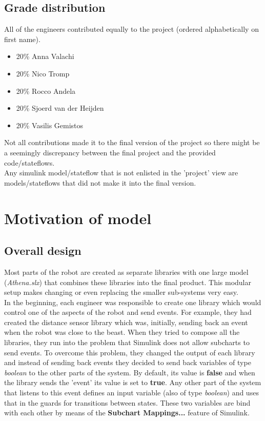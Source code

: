 \documentclass[a4paper,12pt]{article}
\begin{document}
\subsection{Grade distribution}
All of the engineers contributed equally to the project (ordered alphabetically on first name).
\begin{itemize}
	\item 20\% Anna Valachi
	\item 20\% Nico Tromp
	\item 20\% Rocco Andela
	\item 20\% Sjoerd van der Heijden
	\item 20\% Vasilis Gemistos 
\end{itemize}
Not all contributions made it to the final version of the project so there might be a 
seemingly discrepancy between the final project and the provided code/stateflows.\\
Any simulink model/stateflow that is not enlisted in the 'project' view are models/stateflows that did not make it into the final version.
\section{Motivation of model}
\subsection{Overall design}
Most parts of the robot are created as separate libraries with one large model (\textit{Athena.slx}) that combines these libraries into the final product. This modular setup makes changing or even replacing the smaller sub-systems very easy.\\
In the beginning, each engineer was responsible to create one library which would control one of the aspects of the robot and send events. For example, they had created the distance sensor library which was, initially, sending back an event when the robot was close to the beast. When they tried to compose all the libraries, they run into the problem that Simulink does not allow subcharts to send events. To overcome this problem, they changed the output of each library and instead of sending back events they decided to send back variables of type \textit{boolean} to the other parts of the system. By default, its value is \textbf{false} and when the library sends the 'event' its value is set to \textbf{true}. Any other part of the system that listens to this event defines an input variable (also of type \textit{boolean}) and uses that in the guards for transitions between states. These two variables are bind with each other by means of the \textbf{Subchart Mappings...} feature of Simulink.
\end{document}
